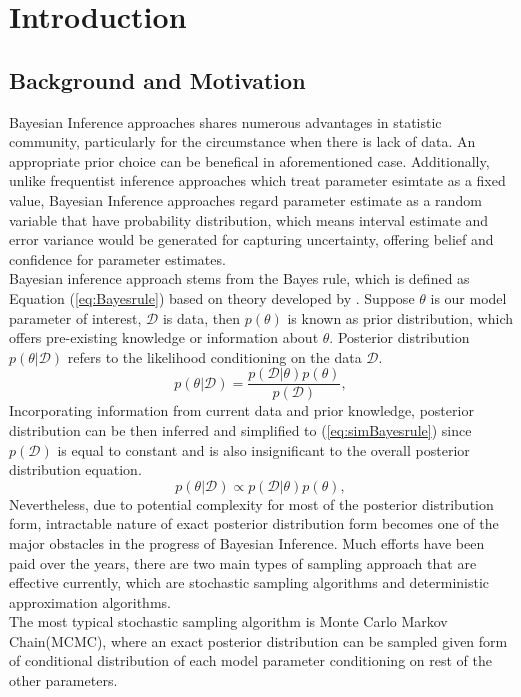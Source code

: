 \chapter{Introduction}
\label{Chapter1}
\section{Background and Motivation}
Bayesian Inference approaches shares numerous advantages in statistic community, particularly for the circumstance when there is lack of data. An appropriate prior choice can be benefical in aforementioned case. Additionally, unlike frequentist inference approaches which treat parameter esimtate as a fixed value, Bayesian Inference approaches regard parameter estimate as a random variable that have probability distribution, which means interval estimate and error variance would be generated for capturing uncertainty, offering belief and confidence for parameter estimates.\\ Bayesian inference approach stems from the Bayes rule, which is defined as Equation (\ref{eq:Bayesrule}) based on theory developed by \cite{Beech1959}. Suppose $\theta$ is our model parameter of interest, $\mathcal{D}$ is data, then $p(\theta)$ is known as prior distribution, which offers pre-existing knowledge or information about $\theta$. Posterior distribution $p(\theta|\mathcal{D})$ refers to the likelihood conditioning on the data $\mathcal{D}$.
\begin{equation}
	p(\theta|\mathcal{D}) = \frac{p(\mathcal{D}|\theta)p(\theta)}{p(\mathcal{D})},
	\label{eq:Bayesrule}
\end{equation}
Incorporating information from current data and prior knowledge, posterior distribution can be then inferred and simplified to (\ref{eq:simBayesrule}) since $p(\mathcal{D})$ is equal to constant and is also insignificant to the overall posterior distribution equation.
\begin{equation}
	p(\theta|\mathcal{D}) \propto p(\mathcal{D}|\theta)p(\theta),
	\label{eq:simBayesrule}
\end{equation}
Nevertheless, due to potential complexity for most of the posterior distribution form, intractable nature of exact posterior distribution form becomes one of the major obstacles in the progress of Bayesian Inference. Much efforts have been paid over the years, there are two main types of sampling approach that are effective currently, which are stochastic sampling algorithms and deterministic approximation algorithms. \\
The most typical stochastic sampling algorithm is Monte Carlo Markov Chain(MCMC), where an exact posterior distribution can be sampled given form of conditional distribution of each model parameter conditioning on rest of the other parameters. 

